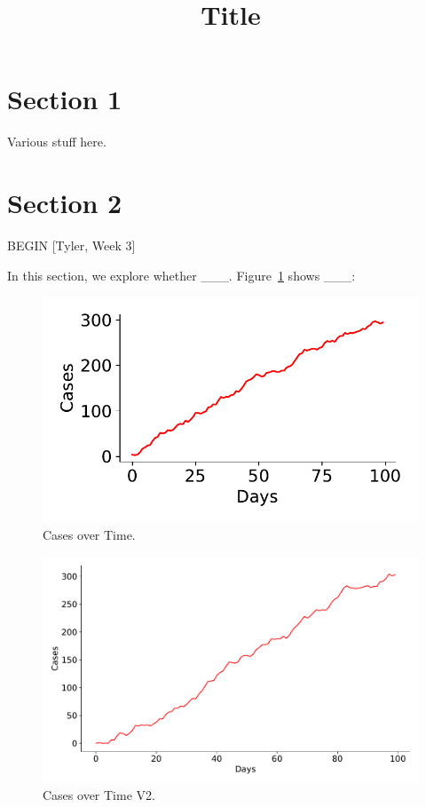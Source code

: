 \documentclass[twocolumn]{article}
\begin{document}
\title{Title}
\maketitle

\section{Section 1}

Various stuff here.

\section{Section 2}

BEGIN [Tyler, Week 3]

In this section, we explore whether \_\_\_.  Figure~\ref{fig:cases}
shows \_\_\_:

\begin{figure}[h]
  \includegraphics[width=\columnwidth]{cases.pdf}
  \caption{Cases over Time.}
  \label{fig:cases}
\end{figure}

\begin{figure}[h]
  \includegraphics[width=\columnwidth]{cases2.pdf}
  \caption{Cases over Time V2.}
  \label{fig:cases2}
\end{figure}
\end{document}
